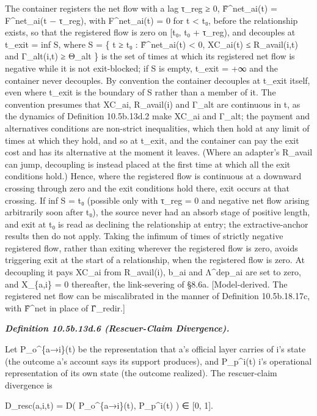 \documentclass[
]{article}
\begin{document}
The container registers the net flow with a lag τ\_reg ≥ 0,
F̂\^{}net\_ai(t) = F\^{}net\_ai(t − τ\_reg), with F\^{}net\_ai(t) = 0 for
t \textless{} t₀, before the relationship exists, so that the registered
flow is zero on {[}t₀, t₀ + τ\_reg), and decouples at t\_exit = inf S,
where S = \{ t ≥ t₀ : F̂\^{}net\_ai(t) \textless{} 0, XC\_ai(t) ≤
R\_avail(i,t) and Γ\_alt(i,t) ≥ Θ\_alt \} is the set of times at which
its registered net flow is negative while it is not exit-blocked; if S
is empty, t\_exit = +∞ and the container never decouples. By convention
the container decouples at t\_exit itself, even where t\_exit is the
boundary of S rather than a member of it. The convention presumes that
XC\_ai, R\_avail(i) and Γ\_alt are continuous in t, as the dynamics of
Definition 10.5b.13d.2 make XC\_ai and Γ\_alt; the payment and
alternatives conditions are non-strict inequalities, which then hold at
any limit of times at which they hold, and so at t\_exit, and the
container can pay the exit cost and has its alternative at the moment it
leaves. (Where an adapter's R\_avail can jump, decoupling is instead
placed at the first time at which all the exit conditions hold.) Hence,
where the registered flow is continuous at a downward crossing through
zero and the exit conditions hold there, exit occurs at that crossing.
If inf S = t₀ (possible only with τ\_reg = 0 and negative net flow
arising arbitrarily soon after t₀), the source never had an absorb stage
of positive length, and exit at t₀ is read as declining the relationship
at entry; the extractive-anchor results then do not apply. Taking the
infimum of times of strictly negative registered flow, rather than
exiting wherever the registered flow is zero, avoids triggering exit at
the start of a relationship, when the registered flow is zero. At
decoupling it pays XC\_ai from R\_avail(i), b\_ai and Λ\^{}dep\_ai are
set to zero, and X\_\{a,i\} = 0 thereafter, the link-severing of §8.6a.
{[}Model-derived. The registered net flow can be miscalibrated in the
manner of Definition 10.5b.18.17c, with F̂\^{}net in place of
Γ̂\_redir.{]}

\emph{\textbf{Definition 10.5b.13d.6 (Rescuer-Claim Divergence).}}

Let P\_o\^{}\{a→i\}(t) be the representation that a's official layer
carries of i's state (the outcome a's account says its support
produces), and P\_p\^{}i(t) i's operational representation of its own
state (the outcome realized). The rescuer-claim divergence is

D\_resc(a,i,t) = D( P\_o\^{}\{a→i\}(t), P\_p\^{}i(t) ) ∈ {[}0, 1{]}.
\end{document}
